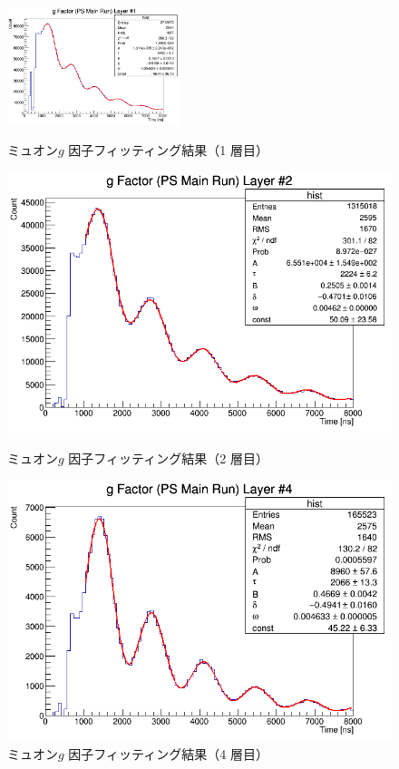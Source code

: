 \begin{figure}[h]
	\centering
	\includegraphics[width = 0.45\textwidth]{figure/odagawa/PSgFactorFit_Layer0.png}
	\caption{ミュオン$g$ 因子フィッティング結果（1 層目）}
	\label{fig:PSgFactorFit_Layer0}
	\begin{minipage}{0.45\textwidth}
	\centering
	\includegraphics[width = \textwidth]{figure/odagawa/PSgFactorFit_Layer1.png}
	\caption{ミュオン$g$ 因子フィッティング結果（2 層目）}
	\label{fig:PSgFactorFit_Layer1}
	\end{minipage}
	\begin{minipage}{0.45\textwidth}
	\centering
	\includegraphics[width = \textwidth]{figure/odagawa/PSgFactorFit_Layer3.png}
	\caption{ミュオン$g$ 因子フィッティング結果（4 層目）}
	\label{fig:PSgFactorFit_Layer3}
	\end{minipage}
\end{figure}%

